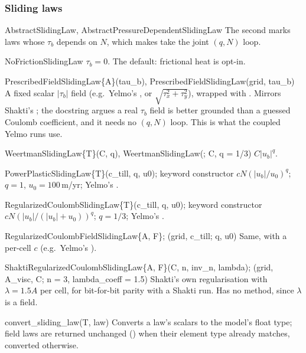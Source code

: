 \subsubsection*{Sliding laws}
\begin{fnlist}
\item[AbstractSlidingLaw, AbstractPressureDependentSlidingLaw] The second marks laws whose $\tau_b$ depends on $N$, which makes
   take the joint $(q, N)$ loop.
\item[NoFrictionSlidingLaw] $\tau_b = 0$. The default: frictional heat is opt-in.
\item[PrescribedFieldSlidingLaw\{A\}(tau\_b), PrescribedFieldSlidingLaw(grid, tau\_b)] A fixed scalar $|\tau_b|$ field (e.g.\ Yelmo's
  , or $\sqrt{\tau_x^2+\tau_y^2}$), wrapped with . Mirrors Shakti's ; the docstring
  argues a real $\tau_b$ field is better grounded than a guessed Coulomb coefficient, and it needs no $(q,N)$ loop. This is what the
  coupled Yelmo runs use.
\item[WeertmanSlidingLaw\{T\}(C, q), WeertmanSlidingLaw(; C, q = 1/3)] $C|u_b|^q$.
\item[PowerPlasticSlidingLaw\{T\}(c\_till, q, u0); keyword constructor] $c N (|u_b|/u_0)^q$; $q = 1$, $u_0 = 100$\,m/yr; Yelmo's
  .
\item[RegularizedCoulombSlidingLaw\{T\}(c\_till, q, u0); keyword constructor] $c N (|u_b|/(|u_b|+u_0))^q$; $q = 1/3$; Yelmo's
  .
\item[RegularizedCoulombFieldSlidingLaw\{A, F\}; (grid, c\_till; q, u0)] Same, with a per-cell $c$ (e.g.\ Yelmo's ).
\item[ShaktiRegularizedCoulombSlidingLaw\{A, F\}(C, n, inv\_n, lambda); (grid, A\_visc, C; n = 3, lambda\_coeff = 1.5)] Shakti's own
  regularisation with $\lambda = 1.5A$ per cell, for bit-for-bit parity with a Shakti run. Has no  method, since
  $\lambda$ is a field.
\item[convert\_sliding\_law(T, law)] Converts a law's scalars to the model's float type; field laws are returned unchanged
  (\code{===}) when their element type already matches, converted otherwise.
\end{fnlist}

